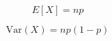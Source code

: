 \documentclass{article}
\begin{document}
\[
E[X] = np
\]

\[
\text{Var}(X) = np(1 - p)
\]
\end{document}

